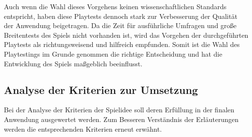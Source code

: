 Auch wenn die Wahl dieses Vorgehens keinen wissenschaftlichen Standards entspricht, haben diese Playtests dennoch stark zur Verbesserung der Qualität der Anwendung beigetragen. Da die Zeit für ausführliche Umfragen und große Breitentests des Spiels nicht vorhanden ist, wird das Vorgehen der durchgeführten Playtests als richtungsweisend und hilfreich empfunden. Somit ist die Wahl des Playtestings im Grunde genommen die richtige Entscheidung und hat die Entwicklung des Spiels maßgeblich beeinflusst.

\subsection{Analyse der Kriterien zur Umsetzung}
Bei der Analyse der Kriterien der Spielidee soll deren Erfüllung in der finalen Anwendung ausgewertet werden.
Zum Besseren Verständnis der Erläuterungen werden die entsprechenden Kriterien erneut erwähnt.
